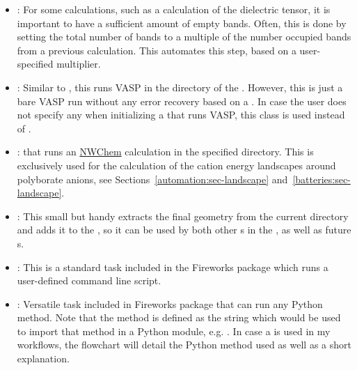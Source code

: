 \begin{refsection}
\begin{itemize} 
 
 \label{automation:sec-IncreaseNumberOfBands} 
\item {}: For some calculations, such as a 
calculation of the dielectric tensor, it is important to have a sufficient 
amount of empty bands. Often, this is done by setting the total number of bands to a multiple of the number
occupied bands from a previous calculation. This  automates 
this step, based on a user-specified multiplier. 
 
 \label{automation:sec-VaspTask} 
\item {}: Similar to 
, this 
 runs \gls{VASP} in the directory of the . 
However, this is just a bare \gls{VASP} run without any error recovery 
based on a . In case the user does not specify any 
 when initializing a  that runs 
VASP, this class is used instead of . 
 
 \label{automation:sec-NWChemTask} 
\item {}:  that runs an 
\href{http://www.nwchem-sw.org/index.php/Main_Page}{NWChem} calculation in 
the specified directory. This is exclusively used for the calculation of the 
cation energy landscapes around polyborate anions, see Sections~\ref{automation:sec-landscape} and~\ref{batteries:sec-landscape}.
 
 \label{automation:sec-AddFinalGeometryToSpec} 
\item {}: This small but handy  
extracts the final geometry from the current directory and adds it to the 
, so it can be used by both other s in the 
, as well as future s. 
 
 \label{automation:sec-ScriptTask} 
\item {}: This is a standard task included in the Fireworks package 
which runs a user-defined command line script. 
 
 \label{automation:sec-PyTask} 
\item {}: Versatile task included in Fireworks package that can run 
any Python method. Note that the method is defined as the string which would 
be used to import that method in a Python module, e.g. 
. In case a 
 is used in my workflows, the flowchart will detail the Python 
method used as well as a short explanation. 


\end{itemize}
\end{refsection}
